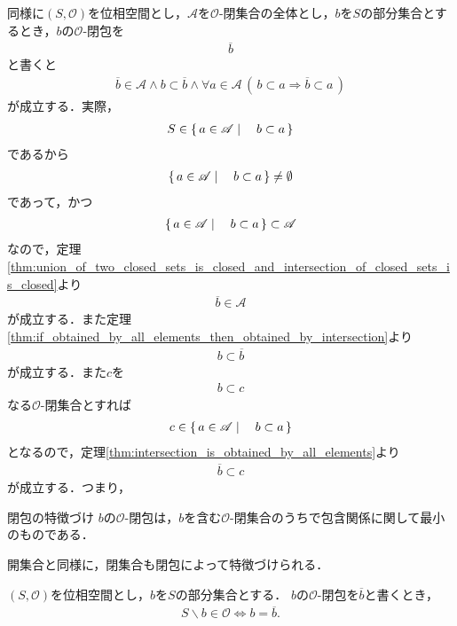 	同様に$(S,\mathscr{O})$を位相空間とし，$\mathscr{A}$を$\mathscr{O}$-閉集合の全体とし，$b$を$S$の部分集合とするとき，$b$の$\mathscr{O}$-閉包を
	\begin{align}
		\overline{b}
	\end{align}
	と書くと
	\begin{align}
		\overline{b} \in \mathscr{A} \wedge b \subset \overline{b} \wedge
		\forall a \in \mathscr{A}\, \left(\, b \subset a \Longrightarrow \overline{b} \subset a\, \right)
		\label{fom:closure_is_the_smallest_closed_set}
	\end{align}
	が成立する．実際，
	\begin{align}
		S \in \left\{\, a \in \mathscr{A} \mid \quad b \subset a\, \right\}
	\end{align}
	であるから
	\begin{align}
		\left\{\, a \in \mathscr{A} \mid \quad b \subset a\, \right\} \neq \emptyset
	\end{align}
	であって，かつ
	\begin{align}
		\left\{\, a \in \mathscr{A} \mid \quad b \subset a\, \right\} \subset \mathscr{A}
	\end{align}
	なので，定理\ref{thm:union_of_two_closed_sets_is_closed_and_intersection_of_closed_sets_is_closed}より
	\begin{align}
		\overline{b} \in \mathscr{A}
	\end{align}
	が成立する．また定理\ref{thm:if_obtained_by_all_elements_then_obtained_by_intersection}より
	\begin{align}
		b \subset \overline{b}
	\end{align}
	が成立する．また$c$を
	\begin{align}
		b \subset c
	\end{align}
	なる$\mathscr{O}$-閉集合とすれば
	\begin{align}
		c \in \left\{\, a \in \mathscr{A} \mid \quad b \subset a\, \right\}
	\end{align}
	となるので，定理\ref{thm:intersection_is_obtained_by_all_elements}より
	\begin{align}
		\overline{b} \subset c
	\end{align}
	が成立する．つまり，
	
	\begin{itembox}[l]{閉包の特徴づけ}
		$b$の$\mathscr{O}$-閉包は，$b$を含む$\mathscr{O}$-閉集合のうちで包含関係に関して最小のものである．
	\end{itembox}
	
	開集合と同様に，閉集合も閉包によって特徴づけられる．
	\begin{screen}
		\begin{thm}[閉集合は自身の閉包に一致する集合である]
		\label{thm:closed_set_coincides_with_its_closure}
			$(S,\mathscr{O})$を位相空間とし，$b$を$S$の部分集合とする．
			$b$の$\mathscr{O}$-閉包を$\overline{b}$と書くとき，
			\begin{align}
				S \backslash b \in \mathscr{O} \Longleftrightarrow b = \overline{b}.
			\end{align}
		\end{thm}
	\end{screen}
	
